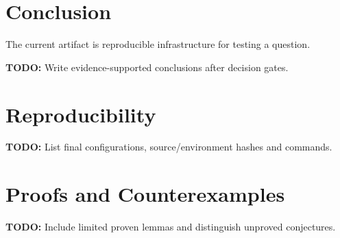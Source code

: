 \documentclass[11pt]{article}
\newcommand{\todo}[1]{\par\noindent\textbf{TODO:} #1\par}
\begin{document}
\section{Conclusion}
The current artifact is reproducible infrastructure for testing a question.
\todo{Write evidence-supported conclusions after decision gates.}


\appendix
\section{Reproducibility}
\todo{List final configurations, source/environment hashes and commands.}
\section{Proofs and Counterexamples}
\todo{Include limited proven lemmas and distinguish unproved conjectures.}
\end{document}

